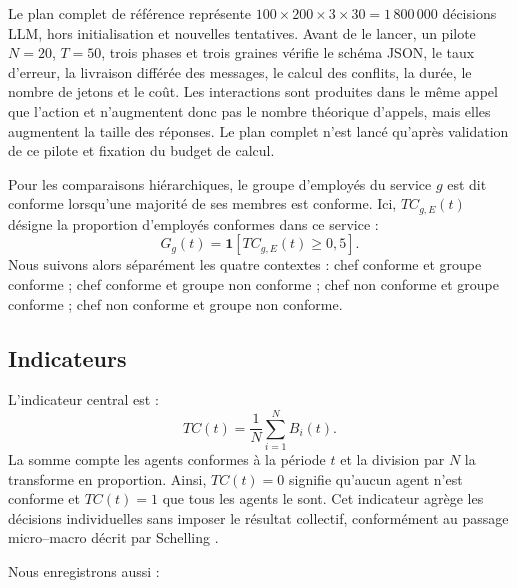 \documentclass[10pt,a4paper]{article}
\begin{document}
Le plan complet de référence représente
$100\times200\times3\times30=1\,800\,000$ décisions LLM, hors
initialisation et nouvelles tentatives. Avant de le lancer, un pilote
$N=20$, $T=50$, trois phases et trois graines vérifie le schéma JSON, le taux
d’erreur, la livraison différée des messages, le calcul des conflits, la durée,
le nombre de jetons et le coût. Les interactions sont produites dans le même
appel que l’action et n’augmentent donc pas le nombre théorique d’appels, mais
elles augmentent la taille des réponses. Le plan complet n’est lancé qu’après
validation de ce pilote et fixation du budget de calcul.

Pour les comparaisons hiérarchiques, le groupe d’employés du service $g$ est
dit conforme lorsqu’une majorité de ses membres est conforme. Ici,
$TC_{g,E}(t)$ désigne la proportion d’employés conformes dans ce service :
\[
G_g(t)=\mathbf 1\!\left[TC_{g,E}(t)\geq0{,}5\right].
\]
Nous suivons alors séparément les quatre contextes : chef conforme et groupe
conforme ; chef conforme et groupe non conforme ; chef non conforme et groupe
conforme ; chef non conforme et groupe non conforme.

\subsection{Indicateurs}

L’indicateur central est :
\[
TC(t)=\frac{1}{N}\sum_{i=1}^{N}B_i(t).
\]
La somme compte les agents conformes à la période $t$ et la division par $N$
la transforme en proportion. Ainsi, $TC(t)=0$ signifie qu’aucun agent n’est
conforme et $TC(t)=1$ que tous les agents le sont. Cet indicateur agrège les
décisions individuelles sans imposer le résultat collectif, conformément au
passage micro--macro décrit par Schelling \cite{schelling2006}.

Nous enregistrons aussi :
\end{document}
